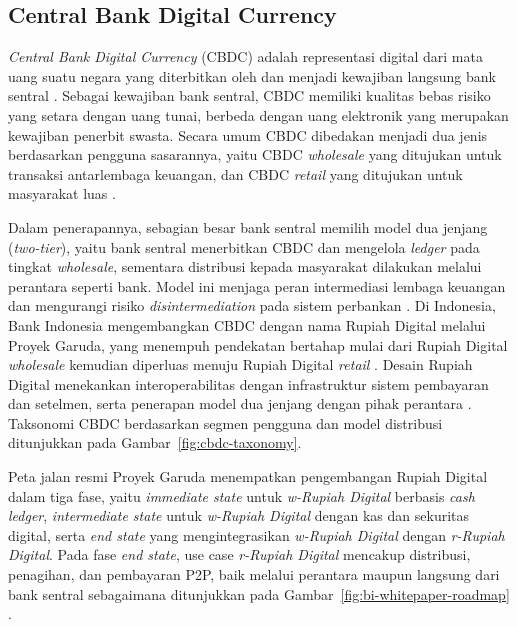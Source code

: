 \subsection{Central Bank Digital Currency}

\textit{Central Bank Digital Currency} (CBDC) adalah representasi digital dari
mata uang suatu negara yang diterbitkan oleh dan menjadi kewajiban langsung bank
sentral \cite{unknown2024p}. Sebagai kewajiban bank sentral, CBDC memiliki
kualitas bebas risiko yang setara dengan uang tunai, berbeda dengan uang
elektronik yang merupakan kewajiban penerbit swasta. Secara umum CBDC dibedakan
menjadi dua jenis berdasarkan pengguna sasarannya, yaitu CBDC \textit{wholesale}
yang ditujukan untuk transaksi antarlembaga keuangan, dan CBDC \textit{retail}
yang ditujukan untuk masyarakat luas \cite{unknown2022f,
SyarifuddinBakhtiar2021Monetary}.

Dalam penerapannya, sebagian besar bank sentral memilih model dua jenjang
(\textit{two-tier}), yaitu bank sentral menerbitkan CBDC dan mengelola
\textit{ledger} pada tingkat \textit{wholesale}, sementara distribusi kepada
masyarakat dilakukan melalui perantara seperti bank. Model ini menjaga peran intermediasi lembaga keuangan dan mengurangi
risiko \textit{disintermediation} pada sistem perbankan \cite{sethaput2025}. Di
Indonesia, Bank Indonesia mengembangkan CBDC dengan nama Rupiah Digital melalui
Proyek Garuda, yang menempuh pendekatan bertahap mulai dari Rupiah Digital
\textit{wholesale} kemudian diperluas menuju Rupiah Digital \textit{retail}
\cite{bi_whitepaper2022}. Desain Rupiah Digital menekankan interoperabilitas
dengan infrastruktur sistem pembayaran dan setelmen, serta penerapan model dua
jenjang dengan pihak perantara
\cite{bi_consultative, bi_garuda_poc}. Taksonomi CBDC berdasarkan segmen
pengguna dan model distribusi ditunjukkan pada Gambar~\ref{fig:cbdc-taxonomy}.



Peta jalan resmi Proyek Garuda menempatkan pengembangan Rupiah Digital dalam
tiga fase, yaitu \textit{immediate state} untuk \textit{w-Rupiah Digital} berbasis
\textit{cash ledger}, \textit{intermediate state} untuk \textit{w-Rupiah Digital}
dengan kas dan sekuritas digital, serta \textit{end state} yang mengintegrasikan
\textit{w-Rupiah Digital} dengan \textit{r-Rupiah Digital}. Pada fase \textit{end state}, use
case \textit{r-Rupiah Digital} mencakup distribusi, penagihan, dan pembayaran P2P, baik
melalui perantara maupun langsung dari bank sentral sebagaimana ditunjukkan
pada Gambar~\ref{fig:bi-whitepaper-roadmap} \cite{bi_whitepaper2022}.

